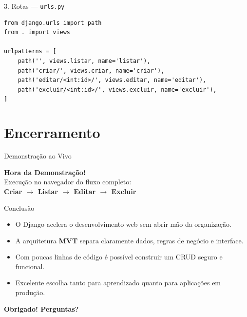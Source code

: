 \documentclass[aspectratio=169, 11pt]{beamer}
\begin{document}
\begin{frame}[fragile]{3. Rotas --- \texttt{urls.py}}
\begin{lstlisting}
from django.urls import path
from . import views

urlpatterns = [
    path('', views.listar, name='listar'),
    path('criar/', views.criar, name='criar'),
    path('editar/<int:id>/', views.editar, name='editar'),
    path('excluir/<int:id>/', views.excluir, name='excluir'),
]
\end{lstlisting}
\end{frame}

\section{Encerramento}

\begin{frame}{Demonstração ao Vivo}
  \begin{center}
    \vspace{0.6cm}
    {\Huge\bfseries\color{djangoDark} Hora da Demonstração!}\\[0.5cm]
    {\large\color{textMuted} Execução no navegador do fluxo completo:}\\[0.4cm]
    {\large\bfseries\color{djangoMid} Criar \quad $\rightarrow$ \quad Listar \quad $\rightarrow$ \quad Editar \quad $\rightarrow$ \quad Excluir}
  \end{center}
\end{frame}

\begin{frame}{Conclusão}
  \begin{itemize}
    \setlength\itemsep{0.55em}
    \item O Django acelera o desenvolvimento web sem abrir mão da organização.
    \item A arquitetura \textbf{MVT} separa claramente dados, regras de negócio e interface.
    \item Com poucas linhas de código é possível construir um CRUD seguro e funcional.
    \item Excelente escolha tanto para aprendizado quanto para aplicações em produção.
  \end{itemize}
  \vspace{0.6cm}
  \begin{center}
    {\Large\bfseries\color{djangoDark} Obrigado! Perguntas?}
  \end{center}
\end{frame}
\end{document}
